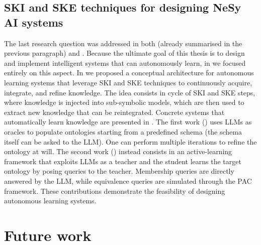\subsection*{\gls{SKI} and \gls{SKE} techniques for designing \gls{NeSy} \gls{AI} systems}
%
The last research question  was addressed in both  (already summarised in the previous paragraph) and .
%
Because the ultimate goal of this thesis is to design and implement intelligent systems that can autonomously learn, in  we focused entirely on this aspect.
%
In  we proposed a conceptual architecture for autonomous learning systems that leverage \gls{SKI} and \gls{SKE} techniques to continuously acquire, integrate, and refine knowledge.
%
The idea consists in cycle of \gls{SKI} and \gls{SKE} steps, where knowledge is injected into sub-symbolic models, which are then used to extract new knowledge that can be reintegrated.
%
Concrete systems that automatically learn knowledge are presented in .
%
The first work () uses \glspl{LLM} as oracles to populate ontologies starting from a predefined schema (the schema itself can be asked to the \gls{LLM}).
%
One can perform multiple iterations to refine the ontology at will.
%
The second work () instead consists in an active-learning framework that exploits \glspl{LLM} as a teacher and the student learns the target ontology by posing queries to the teacher.
%
Membership queries are directly answered by the \gls{LLM}, while equivalence queries are simulated through the \gls{PAC} framework.
%
These contributions demonstrate the feasibility of designing autonomous learning systems.



\section{Future work}\label{sec:future-work}